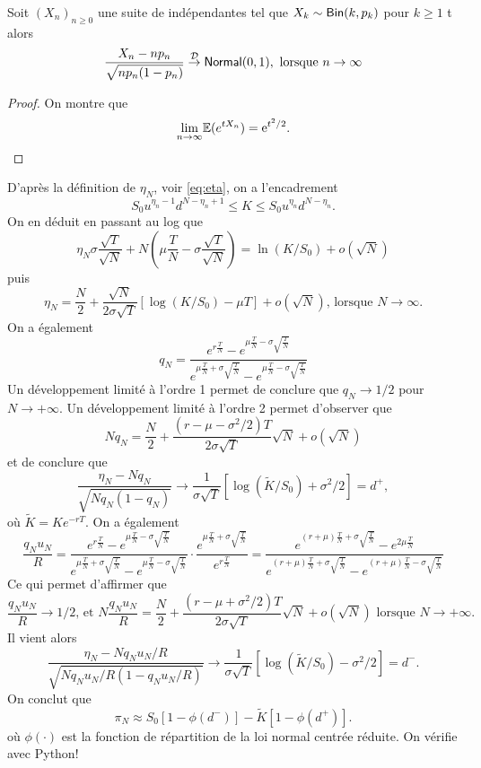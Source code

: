 \begin{lemma}
Soit $(X_n)_{n\geq0}$ une suite de \va indépendantes tel que $X_k\sim\mathsf{Bin}(k, p_k)$ pour $k\geq1$ t alors 
$$
\frac{X_n-np_n}{\sqrt{np_n(1-p_n)}}\overset{\mathcal{D}}{\rightarrow}\mathsf{Normal}(0,1), \text{ lorsque }n\rightarrow\infty
$$
\end{lemma}
\begin{proof}
On montre que 
$$
\underset{n\rightarrow \infty}{\lim} \mathbb{E}(e^{tX_n})= \mathrm{e}^{t^2/2}.
$$
\end{proof}
D'après la définition de $\eta_N$, voir \eqref{eq:eta}, on a l'encadrement
$$
S_0u^{\eta_n-1}d^{N-\eta_n+1}\leq K\leq S_0u^{\eta_n}d^{N-\eta_n}.
$$
On en déduit en passant au log que  
$$
\eta_N\sigma\frac{\sqrt{T}}{\sqrt{N}} + N\left(\mu\frac{T}{N} - \sigma\frac{\sqrt{T}}{\sqrt{N}}\right) =\ln(K/S_0)+o(\sqrt{N})
$$
puis
$$
\eta_N = \frac{N}{2}+\frac{\sqrt{N}}{2\sigma\sqrt{T}}\left[\log(K/S_0)-\mu T\right]+ o(\sqrt{N})\text{, lorsque }N\rightarrow\infty.
$$
On a également
$$
q_{N} = \frac{e^{r\frac TN}-e^{\mu\frac TN-\sigma\sqrt{\frac{T}{N}}}}{e^{\mu\frac TN+\sigma\sqrt{\frac TN}} - e^{\mu\frac TN-\sigma\sqrt{\frac{T}{N}}}}
$$
Un développement limité à l'ordre 1 permet de conclure que $q_N\rightarrow 1/2$ pour $N\rightarrow +\infty$. Un développement limité à l'ordre 2 permet d'observer que 
$$
Nq_N = \frac{N}{2}+\frac{(r-\mu-\sigma^2/2)T}{2\sigma\sqrt{T}}\sqrt{N} + o(\sqrt{N})
$$
et de conclure que 
$$
\frac{\eta_N - Nq_N}{\sqrt{Nq_N(1-q_N)}} \rightarrow \frac{1}{\sigma\sqrt{T}}\left[\log(\widetilde{K}/S_0) + \sigma^2/2\right]= d^+,
$$
où $\widetilde{K} = Ke^{-rT}$. On a également 
$$
\frac{q_Nu_N}{R} = \frac{e^{r\frac TN}-e^{\mu\frac TN-\sigma\sqrt{\frac{T}{N}}}}{e^{\mu\frac TN+\sigma\sqrt{\frac TN}} - e^{\mu\frac TN-\sigma\sqrt{\frac{T}{N}}}}
\cdot 
\frac{e^{\mu\frac TN+\sigma\sqrt{\frac{T}{N}}}}{e^{r\frac TN}} = 
\frac{e^{(r+\mu)\frac TN+\sigma\sqrt{\frac TN}}-e^{2\mu\frac TN}}{e^{(r+\mu)\frac TN+\sigma\sqrt{\frac TN}} - e^{(r+\mu)\frac TN-\sigma\sqrt{\frac{T}{N}}}}
$$
Ce qui permet d'affirmer que 
$$\frac{q_Nu_N}{R}\rightarrow 1/2\text{, et }
N\frac{q_Nu_N}{R} = \frac{N}{2}+\frac{(r-\mu+\sigma^2/2)T}{2\sigma\sqrt{T}}\sqrt{N} + o(\sqrt{N})\text{ lorsque } N\rightarrow +\infty.
$$
Il vient alors 
$$
\frac{\eta_N - Nq_Nu_N/R}{\sqrt{Nq_Nu_N/R(1-q_Nu_N/R)}} \rightarrow \frac{1}{\sigma\sqrt{T}}\left[\log(\widetilde{K}/S_0) - \sigma^2/2\right] = d^-. 
$$
On conclut que 
$$
\pi_N\approx S_0[1-\phi(d^-)]- \widetilde{K} [1-\phi(d^+)].
$$
où $\phi(\cdot)$ est la fonction de répartition de la loi normal centrée réduite. On vérifie avec Python!

